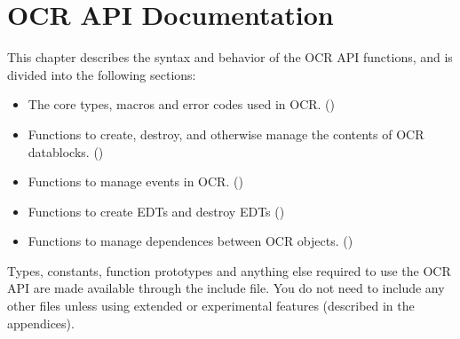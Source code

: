 %

\chapter{OCR API Documentation}
\label{chap:OCRAPI}


This chapter describes the syntax and behavior of the OCR API functions, and is divided 
into the following sections:

\begin{itemize}
\item The core types, macros and error codes used in OCR.
()

\item Functions to create, destroy, and otherwise manage the contents of OCR datablocks.
()

\item Functions to manage events in OCR. 
() 

\item Functions to create EDTs and  destroy EDTs
()

\item Functions to manage dependences between OCR objects.
()

\end{itemize}

Types, constants, function prototypes and anything else required to use the 
OCR API are made available through the  include file.  You do not 
need to include any other files unless using extended or experimental
features (described in the appendices). 


